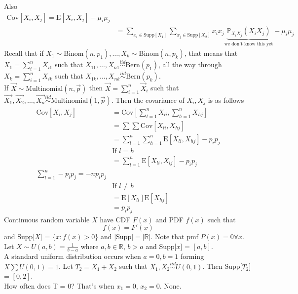 \documentclass[12pt]{article}
\newcommand{\probsub}[2]{\mathbb{P}_{#1}(#2)}
\newcommand{\iid}{\stackrel{iid}{\sim}}
\newcommand{\set}[1]{\Big\{ #1 \Big\}}
\newcommand{\expected}[1]{\mathrm{E}[#1]}
\newcommand{\covariance}[1]{\mathrm{Cov}[#1]}
\begin{document}
Also $$\begin{aligned} \covariance{X_i, X_j} = \expected{X_i, X_j} - \mu_i \mu_j \\ 
&= \sum_{x_i \in \text{Supp}[X_1]} \sum_{x_j \in \text{Supp}[X_2]} x_ix_j \underbrace{\probsub{X_iX_j}{X_iX_j}}_{\text{we don't know this yet}} - \mu_i \mu_j \end{aligned} $$ 
Recall that if $X_1 \sim \text{Binom}(n, p_1), \dots, X_k \sim \text{Binom}(n, p_k)$, that means that $X_1 = \sum_{i = 1}^n X_{i1}$ such that $X_{11}, \dots, X_{n1} \iid \text{Bern}(p_1)$, all the way through $X_k = \sum_{i = 1}^n X_{ik}$ such that $X_{1k}, \dots, X_{nk} \iid \text{Bern}(p_k)$. \\
If $\vec{X} \sim \text{Multinomial}(n, \vec{p})$ then $\vec{X} = \sum_{i = 1}^n \vec{X}_i$ such that $\vec{X_1}, \vec{X_2}, \dots, \vec{X_n} \iid \text{Multinomial}(1, \vec{p})$. Then the covariance of $X_i, X_j$ is as follows $$\begin{aligned} \covariance{X_i, X_j} &= \covariance{\sum_{l = 1}^n X_{li}, \sum_{h = 1}^n X_{hj}} \\ &= \sum \sum \covariance{X_{li}, X_{hj}} \\ &= \sum_{l = 1}^n \sum_{h = 1}^n \expected{X_{li}, X_{hj}} - p_ip_j \\ &\text{If } l = h \\ &= \sum_{l = 1}^n \expected{X_{li}, X_{lj}} - p_ip_j \\ \sum_{l = 1}^n -p_ip_j = -np_ip_j \\ &\text{If } l \neq h \\ &= \expected{X_{li}}\expected{X_{hj}} \\ &= p_ip_j \end{aligned} $$
Continuous random variable $X$ have CDF $F(x)$ and PDF $f(x)$ such that $$f(x) = F'(x)$$ and Supp[$X$] = $\set{x: f(x) > 0}$ and $|\text{Supp}| = |\mathbb{R}|$. Note that pmf $P(x) = 0 \forall x$. \\ Let $X \sim U(a, b) = \frac{1}{b - a}$ where $a,b \in \mathbb{R}$, $b > a$ and Supp[$x$] = $[a,b]$.\\ A standard uniform distribution occurs when $a = 0, b = 1$ forming $X \sum U(0, 1) = 1$. Let $T_2 = X_1 + X_2$ such that $X_1, X_2 \iid U(0, 1)$. Then Supp[$T_2$] = $[0,2]$. \\ How often does T = 0? That's when $x_1 = 0$, $x_2 = 0$. None. 
\end{document}
